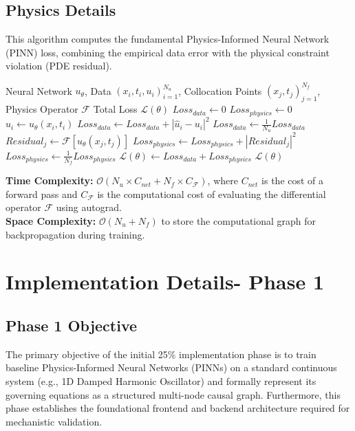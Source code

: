 \documentclass[12pt,singleside,a4paper]{article}
\begin{document}
\subsection{Physics Details}
This algorithm computes the fundamental Physics-Informed Neural Network (PINN) loss, combining the empirical data error with the physical constraint violation (PDE residual).

\begin{algorithm}[H]
\caption{Calculate PINN Total Loss (Compute-PINN-Loss)}
\begin{algorithmic}[1]
\Require Neural Network $u_\theta$, Data $(x_i, t_i, u_i)_{i=1}^{N_u}$, Collocation Points $(x_j, t_j)_{j=1}^{N_f}$, Physics Operator $\mathcal{F}$
\Ensure Total Loss $\mathcal{L}(\theta)$
\State $Loss_{data} \gets 0$
\State $Loss_{physics} \gets 0$
    \State $\hat{u}_i \gets u_\theta(x_i, t_i)$
    \State $Loss_{data} \gets Loss_{data} + |\hat{u}_i - u_i|^2$
\EndFor
\State $Loss_{data} \gets \frac{1}{N_u} Loss_{data}$
    \State $Residual_j \gets \mathcal{F}[u_\theta(x_j, t_j)]$
    \State $Loss_{physics} \gets Loss_{physics} + |Residual_j|^2$
\EndFor
\State $Loss_{physics} \gets \frac{1}{N_f} Loss_{physics}$
\State $\mathcal{L}(\theta) \gets Loss_{data} + Loss_{physics}$
\State \Return $\mathcal{L}(\theta)$
\end{algorithmic}
\end{algorithm}

\textbf{Time Complexity:} $\mathcal{O}(N_u \times C_{net} + N_f \times C_{\mathcal{F}})$, where $C_{net}$ is the cost of a forward pass and $C_{\mathcal{F}}$ is the computational cost of evaluating the differential operator $\mathcal{F}$ using autograd. \\
\textbf{Space Complexity:} $\mathcal{O}(N_u + N_f)$ to store the computational graph for backpropagation during training.

\section{Implementation Details- Phase 1}
\subsection{Phase 1 Objective}
The primary objective of the initial 25\% implementation phase is to train baseline Physics-Informed Neural Networks (PINNs) on a standard continuous system (e.g., 1D Damped Harmonic Oscillator) and formally represent its governing equations as a structured multi-node causal graph. Furthermore, this phase establishes the foundational frontend and backend architecture required for mechanistic validation.
\end{document}
